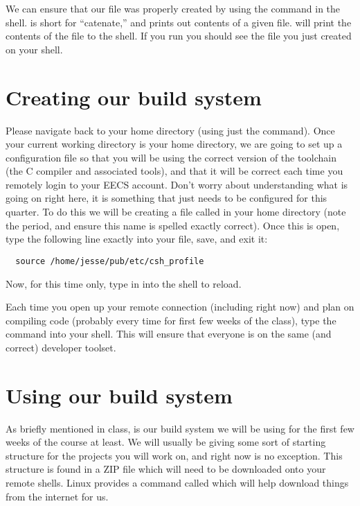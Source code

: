 \documentclass{tufte-handout}
\begin{document}
We can ensure that our file was properly created by using the
 command in the shell.  is short for
``catenate,'' and prints out contents of a given file.   will print the contents of the file to the shell. If
you run  you should see the file you just
created on your shell.

\section{Creating our build system}

Please navigate back to your home directory (using just the 
command). Once your current working directory is your home directory, we
are going to set up a configuration file so that you will be using the
correct version of the toolchain (the C compiler and associated tools),
and that it will be correct each time you remotely login to your EECS
account. Don't worry about understanding what is going on right here, it
is something that just needs to be configured for this quarter. To do
this we will be creating a file called  in your home
directory (note the period, and ensure this name is spelled exactly
correct). Once this is open, type
the following line exactly into your file, save, and exit it:

\begin{verbatim}
  source /home/jesse/pub/etc/csh_profile
\end{verbatim}

Now, for this time only, type in  into the shell to
reload.

Each time you open up your remote connection (including right now) and
plan on compiling code (probably every time for first few weeks of the
class), type the  command into your shell.  This will
ensure that everyone is on the same (and correct) developer toolset.

\section{Using our build system}

As briefly mentioned in class,  is our build system we
will be using for the first few weeks of the course at least.  We will
usually be giving some sort of starting structure for the projects you
will work on, and right now is no exception.  This structure is found in
a ZIP file which will need to be downloaded onto your remote shells.
Linux provides a command called  which will help download
things from the internet for us.
\end{document}
